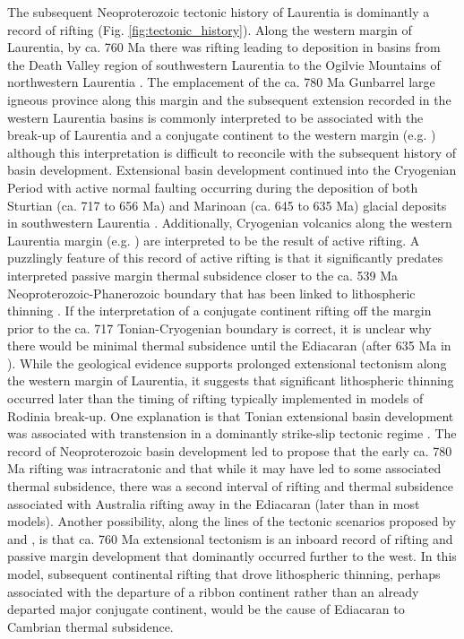 \documentclass[twocolumn, switch]{article} %
\begin{document}
The subsequent Neoproterozoic tectonic history of Laurentia is dominantly a record of rifting (Fig. \ref{fig:tectonic_history}). Along the western margin of Laurentia, by ca. 760 Ma there was rifting leading to deposition in basins from the Death Valley region of southwestern Laurentia to the Ogilvie Mountains of northwestern Laurentia \citep{Macdonald2013a, Strauss2015a, Dehler2017a, Rooney2017a}. The emplacement of the ca. 780 Ma Gunbarrel large igneous province \citep{Harlan2003a} along this margin and the subsequent extension recorded in the western Laurentia basins is commonly interpreted to be associated with the break-up of Laurentia and a conjugate continent to the western margin (e.g. \citealp{Li2008a}) although this interpretation is difficult to reconcile with the subsequent history of basin development. Extensional basin development continued into the Cryogenian Period with active normal faulting occurring during the deposition of both Sturtian (ca. 717 to 656 Ma) and Marinoan (ca. 645 to 635 Ma) glacial deposits in southwestern Laurentia \citep{Yonkee2014a, Nelson2020a}. Additionally, Cryogenian volcanics along the western Laurentia margin (e.g. \citealp{Eyster2018a}) are interpreted to be the result of active rifting.  A puzzlingly feature of this record of active rifting is that it significantly predates interpreted passive margin thermal subsidence closer to the ca. 539 Ma Neoproterozoic-Phanerozoic boundary that has been linked to lithospheric thinning \citep{Bond1984a, Levy1991a}. If the interpretation of a conjugate continent rifting off the margin prior to the ca. 717 Tonian-Cryogenian boundary is correct, it is unclear why there would be minimal thermal subsidence until the Ediacaran (after 635 Ma in \citealp{Levy1991a}). While the geological evidence supports prolonged extensional tectonism along the western margin of Laurentia,  it suggests that significant lithospheric thinning occurred later than the timing of rifting typically implemented in models of Rodinia break-up. One explanation is that Tonian extensional basin development was associated with transtension in a dominantly strike-slip tectonic regime \citep{Smith2015b, Strauss2015a}. The record of Neoproterozoic basin development led \cite{Yonkee2014a} to propose that the early ca. 780 Ma rifting was intracratonic and that while it may have led to some associated thermal subsidence, there was a second interval of rifting and thermal subsidence associated with Australia rifting away in the Ediacaran (later than in most models). Another possibility, along the lines of the tectonic scenarios proposed by \citet{Ross1991a} and \citet{Colpron2002a}, is that ca. 760 Ma extensional tectonism is an inboard record of rifting and passive margin development that dominantly occurred further to the west. In this model, subsequent continental rifting that drove lithospheric thinning, perhaps associated with the departure of a ribbon continent rather than an already departed major conjugate continent, would be the cause of Ediacaran to Cambrian thermal subsidence.
\end{document}

